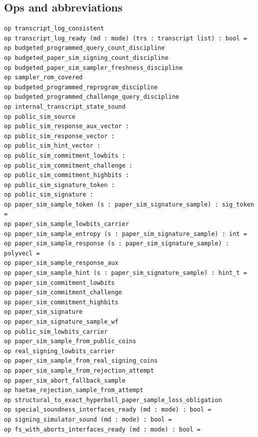 \subsection*{Ops and abbreviations}
\begin{lstlisting}[language=EasyCrypt,basicstyle=\ttfamily\tiny]
op transcript_log_consistent
op transcript_log_ready (md : mode) (trs : transcript list) : bool =
op budgeted_programmed_query_count_discipline
op budgeted_paper_sim_signing_count_discipline
op budgeted_paper_sim_sampler_freshness_discipline
op sampler_rom_covered
op budgeted_programmed_reprogram_discipline
op budgeted_programmed_challenge_query_discipline
op internal_transcript_state_sound
op public_sim_source
op public_sim_response_aux_vector :
op public_sim_response_vector :
op public_sim_hint_vector :
op public_sim_commitment_lowbits :
op public_sim_commitment_challenge :
op public_sim_commitment_highbits :
op public_sim_signature_token :
op public_sim_signature :
op paper_sim_sample_token (s : paper_sim_signature_sample) : sig_token =
op paper_sim_sample_lowbits_carrier
op paper_sim_sample_entropy (s : paper_sim_signature_sample) : int =
op paper_sim_sample_response (s : paper_sim_signature_sample) : polyvecl =
op paper_sim_sample_response_aux
op paper_sim_sample_hint (s : paper_sim_signature_sample) : hint_t =
op paper_sim_commitment_lowbits
op paper_sim_commitment_challenge
op paper_sim_commitment_highbits
op paper_sim_signature
op paper_sim_signature_sample_wf
op public_sim_lowbits_carrier
op paper_sim_sample_from_public_coins
op real_signing_lowbits_carrier
op paper_sim_sample_from_real_signing_coins
op paper_sim_sample_from_rejection_attempt
op paper_sim_abort_fallback_sample
op haetae_rejection_sample_from_attempt
op structural_to_exact_hyperball_paper_sample_loss_obligation
op special_soundness_interfaces_ready (md : mode) : bool =
op signing_simulator_sound (md : mode) : bool =
op fs_with_aborts_interfaces_ready (md : mode) : bool =
\end{lstlisting}

